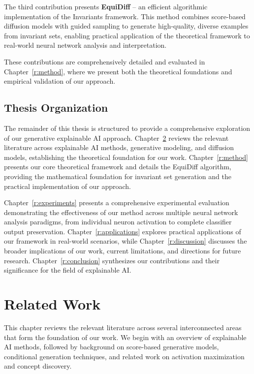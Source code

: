 \documentclass[licencjacka,en]{pracamgr}
\newcommand{\method}[1]{EquiDiff}  %
\newcommand{\framework}[1]{Invariants}  %
\begin{document}
The third contribution presents \textbf{\method{}} -- an efficient algorithmic implementation of the \framework{} framework. This method combines score-based diffusion models with guided sampling to generate high-quality, diverse examples from invariant sets, enabling practical application of the theoretical framework to real-world neural network analysis and interpretation.

These contributions are comprehensively detailed and evaluated in Chapter~\ref{r:method}, where we present both the theoretical foundations and empirical validation of our approach.

\section{Thesis Organization}

The remainder of this thesis is structured to provide a comprehensive exploration of our generative explainable AI approach. Chapter~\ref{r:related_work} reviews the relevant literature across explainable AI methods, generative modeling, and diffusion models, establishing the theoretical foundation for our work. Chapter~\ref{r:method} presents our core theoretical framework and details the \method{} algorithm, providing the mathematical foundation for invariant set generation and the practical implementation of our approach.

Chapter~\ref{r:experiments} presents a comprehensive experimental evaluation demonstrating the effectiveness of our method across multiple neural network analysis paradigms, from individual neuron activation to complete classifier output preservation. Chapter~\ref{r:applications} explores practical applications of our framework in real-world scenarios, while Chapter~\ref{r:discussion} discusses the broader implications of our work, current limitations, and directions for future research. Chapter~\ref{r:conclusion} synthesizes our contributions and their significance for the field of explainable AI.

\chapter{Related Work}\label{r:related_work}

This chapter reviews the relevant literature across several interconnected areas that form the foundation of our work. We begin with an overview of explainable AI methods, followed by background on score-based generative models, conditional generation techniques, and related work on activation maximization and concept discovery.
\end{document}
